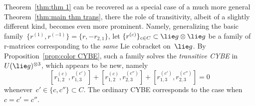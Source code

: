 \documentclass[12pt, reqno]{amsart}
\theoremstyle{definition}
\numberwithin{equation}{section}
\newcommand{\tensor}{\otimes}
\begin{document}
Theorem~\ref{thm:thm 1} can be recovered as a special case of a much more general Theorem~\ref{thm:main thm trans}, there the role of transitivity, albeit of a slightly different kind, becomes even more prominent. 
Namely, generalizing the basic family~$\{r^{(1)},r^{(-1)}\}=
\{r,-r_{2,1}\}$, let
$\{r^{(c)}\}_{c\in C}\subset \lie g\tensor\lie g$ be a 
family of r-matrices
corresponding to the {\em same} Lie cobracket on~$\lie g$. By Proposition~\ref{prop:color CYBE}, such a family solves 
the {\em transitive CYBE} in~$U(\lie g)^{\tensor 3}$, which appears to be new, namely
\begin{equation}\label{eq:trans CYBE}
[r_{1,2}^{(c)},r_{1,3}^{(c')}]+[r_{1,2}^{(c)},r_{2,3}^{(c'')}]+[r_{1,3}^{(c')},
r_{2,3}^{(c'')}]=0
\end{equation}
whenever~$c'\in\{c,c''\}\subset C$. The ordinary CYBE corresponds to the
case when~$c=c'=c''$. 
\end{document}
